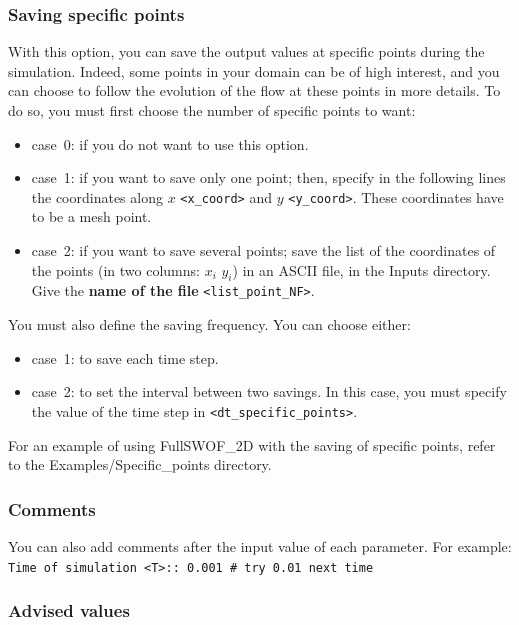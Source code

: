 \documentclass[a4paper, 11pt]{article}
\newcommand{\FullSWOF}{FullSWOF\_2D}
\begin{document}
\subsubsection{Saving specific points}

With this option, you can save the output values at specific points during the simulation.
Indeed, some points in your domain can be of high interest, and you can choose to follow the evolution of the flow at these points in more details.
To do so, you must first choose the number of specific points to want:
\begin{itemize}
	\item case~0: if you do not want to use this option.
	\item case~1: if you want to save only one point; then, specify in the following lines the coordinates along \(x\) \texttt{<x\_coord>} and \(y\) \texttt{<y\_coord>}.
	      These coordinates have to be a mesh point.
	\item case~2: if you want to save several points; save the list of the coordinates of the points (in two columns: \(x_i\) \(y_i\)) in an ASCII file, in the \textsf{Inputs} directory.
	      Give the \textbf{name of the file} \texttt{<list\_point\_NF>}.
\end{itemize}

You must also define the saving frequency.
You can choose either:
\begin{itemize}
	\item case~1: to save each time step.
	\item case~2: to set the interval between two savings.
	      In this case, you must specify the value of the time step in \texttt{<dt\_specific\_points>}.
\end{itemize}

For an example of using \FullSWOF{} with the saving of specific points, refer to the \textsf{Examples/Specific\_points} directory.

\subsubsection{Comments}
You can also add comments after the input value of each parameter.
For  example:\newline
\texttt{Time of simulation <T>:: 0.001 \# try 0.01 next time}

\subsubsection{Advised values}\label{rem:default}
\end{document}

